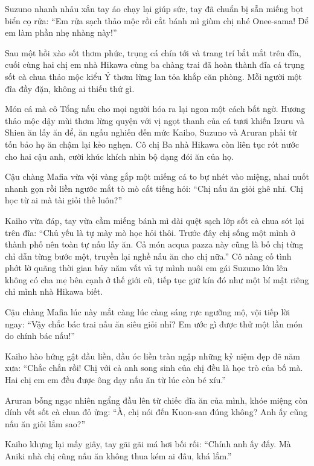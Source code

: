 \documentclass[../main.tex]{subfiles}
\begin{document}
Suzuno nhanh nhảu xắn tay áo chạy lại giúp sức, tay đã chuẩn bị sẵn miếng bọt biển cọ rửa: ``Em rửa sạch thảo mộc rồi cắt bánh mì giùm chị nhé Onee-sama! Để em làm phần nhẹ nhàng này!''

\ct

Sau một hồi xào sốt thơm phức, trụng cá chín tới và trang trí bắt mắt trên đĩa, cuối cùng hai chị em nhà Hikawa cùng ba chàng trai đã hoàn thành đĩa cá trụng sốt cà chua thảo mộc kiểu Ý thơm lừng lan tỏa khắp căn phòng. Mỗi người một đĩa đầy đặn, không ai thiếu thứ gì.

Món cá mà cô Tổng nấu cho mọi người hóa ra lại ngon một cách bất ngờ. Hương thảo mộc dậy mùi thơm lừng quyện với vị ngọt thanh của cá tươi khiến Izuru và Shien ăn lấy ăn để, ăn ngấu nghiến đến mức Kaiho, Suzuno và Aruran phải từ tốn bảo họ ăn chậm lại kẻo nghẹn. Cô chị Ba nhà Hikawa còn liên tục rót nước cho hai cậu anh, cười khúc khích nhìn bộ dạng đói ăn của họ.

Cậu chàng Mafia vừa vội vàng gắp một miếng cá to bự nhét vào miệng, nhai nuốt nhanh gọn rồi liền ngước mắt tò mò cất tiếng hỏi: ``Chị nấu ăn giỏi ghê nhỉ. Chị học từ ai mà tài giỏi thế luôn?''

Kaiho vừa đáp, tay vừa cầm miếng bánh mì dài quệt sạch lớp sốt cà chua sót lại trên đĩa: ``Chủ yếu là tự mày mò học hỏi thôi. Trước đây chị sống một mình ở thành phố nên toàn tự nấu lấy ăn. Cả món acqua pazza này cũng là bố chị từng chỉ dẫn từng bước một, truyền lại nghề nấu ăn cho chị nữa.'' Cô nàng cố tình phớt lờ quãng thời gian bảy năm vất vả tự mình nuôi em gái Suzuno lớn lên không có cha mẹ bên cạnh ở thế giới cũ, tiếp tục giữ kín đó như một bí mật riêng chỉ mình nhà Hikawa biết.

Cậu chàng Mafia lúc này mắt càng lúc càng sáng rực ngưỡng mộ, vội tiếp lời ngay: ``Vậy chắc bác trai nấu ăn siêu giỏi nhỉ? Em ước gì được thử một lần món do chính bác nấu!''

Kaiho hào hứng gật đầu liền, đầu óc liền tràn ngập những kỷ niệm đẹp đẽ năm xưa: ``Chắc chắn rồi! Chị với cả anh song sinh của chị đều là học trò của bố mà. Hai chị em em đều được ông dạy nấu ăn từ lúc còn bé xíu.''

Aruran bỗng ngạc nhiên ngẩng đầu lên từ chiếc đĩa ăn của mình, khóe miệng còn dính vết sốt cà chua đỏ ửng: ``À, chị nói đến Kuon-san đúng không? Anh ấy cũng nấu ăn giỏi lắm sao?''

Kaiho khựng lại mấy giây, tay gãi gãi má hơi bối rối: ``Chính anh ấy đấy. Mà Aniki nhà chị cũng nấu ăn không thua kém ai đâu, khá lắm.''
\end{document}
